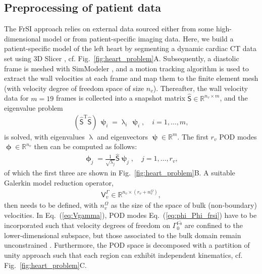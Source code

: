 \subsection*{Preprocessing of patient data}
The FrSI approach relies on external data sourced either from some high-dimensional model or from patient-specific imaging data. Here, we build a patient-specific model of the left heart by segmenting a dynamic cardiac CT data set using 3D Slicer \cite{kikinis2014-3dslicer}, cf. Fig.~\ref{fig:heart_problem}A. Subsequently, a diastolic frame is meshed with SimModeler \cite{simmodeler}, and a motion tracking algorithm is used to extract the wall velocities at each frame and map them to the finite element mesh (with velocity degree of freedom space of size $n_{v}$). Thereafter, the wall velocity data for $m=19$ frames is collected into a snapshot matrix $\hat{\boldsymbol{\mathsf{S}}} \in \mathbb{R}^{n_{v} \times m}$, and the eigenvalue problem
\begin{align}
    (\hat{\boldsymbol{\mathsf{S}}}^{\mathrm{T}} \hat{\boldsymbol{\mathsf{S}}}) \,\boldsymbol{\uppsi}_{i} = \uplambda_{i} \,\boldsymbol{\uppsi}_{i}, \quad i = 1, \hdots, m,\label{eq:rom_eigensolve}
\end{align}
is solved, with eigenvalues $\uplambda$ and eigenvectors $\boldsymbol{\uppsi} \in \mathbb{R}^{m}$. The first $r_{v}$ POD modes $\boldsymbol{\upphi} \in \mathbb{R}^{n_{v}}$ then can be computed as follows:
\begin{align}
    \boldsymbol{\upphi}_{j} = \frac{1}{\sqrt{\uplambda_{j}}} \hat{\boldsymbol{\mathsf{S}}} \boldsymbol{\uppsi}_{j}, \quad j = 1, \hdots, r_{v}, \label{eq:phi_Phi_frsi}
\end{align}
of which the first three are shown in Fig.~\ref{fig:heart_problem}B. A suitable Galerkin model reduction operator,
\begin{align}
    \boldsymbol{\mathsf{V}}_{v}^{\mathit{\Gamma}} \in \mathbb{R}^{n_v \times (r_v + n_{v}^{\mathit{\Omega}})}, \label{eq:Vgamma}
\end{align}
then needs to be defined, with $n_{v}^{\mathit{\Omega}}$ as the size of the space of bulk (non-boundary) velocities. In Eq.~(\ref{eq:Vgamma}), POD modes Eq.~(\ref{eq:phi_Phi_frsi}) have to be incorporated such that velocity degrees of freedom on $\mathit{\Gamma}_{0}^{\mathrm{f}\text{-}\tilde{\mathrm{s}}}$ are confined to the lower-dimensional subspace, but those associated to the bulk domain remain unconstrained \cite{hirschvogel2024-frsi}. Furthermore, the POD space is decomposed with a partition of unity approach such that each region can exhibit independent kinematics, cf. Fig.~\ref{fig:heart_problem}C.

